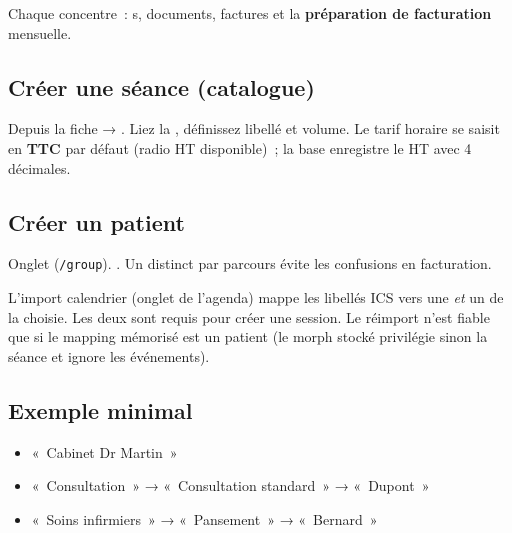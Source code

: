 Chaque \structure{} concentre~: \seance{}s, documents, factures et la \textbf{préparation de facturation} mensuelle.

\subsection{Créer une séance (catalogue)}

\begin{workflowstep}[Séance]
  Depuis la fiche \structure{} → . Liez la \prestation{}, définissez libellé et volume. Le tarif horaire se saisit en \textbf{TTC} par défaut (radio HT disponible)~; la base enregistre le HT avec 4 décimales.
\end{workflowstep}

\subsection{Créer un patient}

\begin{workflowstep}[Patient]
  Onglet  (\texttt{/group}). . Un \patient{} distinct par parcours évite les confusions en facturation.
\end{workflowstep}


\begin{astuce}
  L'import calendrier (onglet  de l'agenda) mappe les libellés ICS vers une \seance{} \emph{et} un \patient{} de la \structure{} choisie. Les deux sont requis pour créer une session. Le réimport n'est fiable que si le mapping mémorisé est un patient (le morph stocké privilégie sinon la séance et ignore les événements).
\end{astuce}

\subsection{Exemple minimal}

\begin{itemize}[leftmargin=*]
  \item \structure{} «~Cabinet Dr Martin~»
  \item \prestation{} «~Consultation~» → \seance{} «~Consultation standard~» → \patient{} «~Dupont~»
  \item \prestation{} «~Soins infirmiers~» → \seance{} «~Pansement~» → \patient{} «~Bernard~»
\end{itemize}
